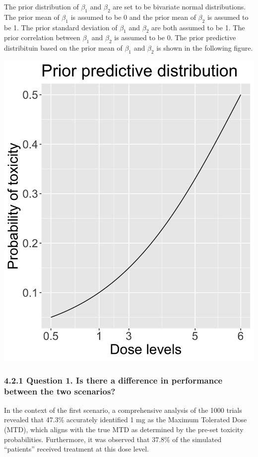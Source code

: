 \documentclass[
]{article}
\begin{document}
The prior distribution of \(\beta_1\) and \(\beta_2\) are set to be
bivariate normal distributions. The prior mean of \(\beta_1\) is assumed
to be 0 and the prior mean of \(\beta_2\) is assumed to be 1. The prior
standard deviation of \(\beta_1\) and \(\beta_2\) are both assumed to be
1. The prior correlation between \(\beta_1\) and \(\beta_2\) is assumed
to be 0. The prior predictive distribituin based on the prior mean of
\(\beta_1\) and \(\beta_2\) is shown in the following figure.

\includegraphics{wenqian_sim_results/prior.png}

\hypertarget{question-1.-is-there-a-difference-in-performance-between-the-two-scenarios}{%
\subsubsection{4.2.1 Question 1. Is there a difference in performance
between the two
scenarios?}\label{question-1.-is-there-a-difference-in-performance-between-the-two-scenarios}}

In the context of the first scenario, a comprehensive analysis of the
1000 trials revealed that 47.3\% accurately identified 1 mg as the
Maximum Tolerated Dose (MTD), which aligns with the true MTD as
determined by the pre-set toxicity probabilities. Furthermore, it was
observed that 37.8\% of the simulated ``patients'' received treatment at
this dose level.
\end{document}
